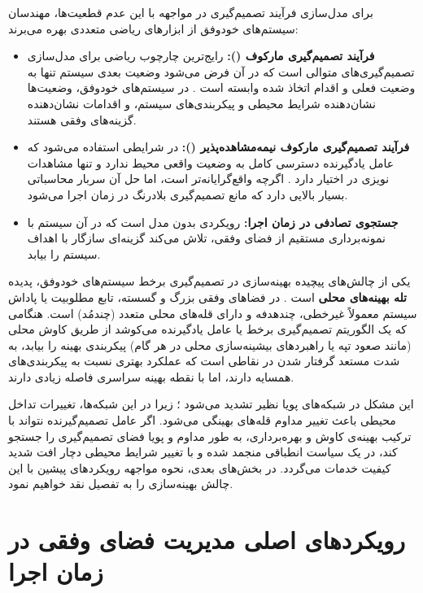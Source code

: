 \documentclass[oneside,openany,phd]{TMU-Thesis}
\begin{document}
برای مدل‌سازی فرآیند تصمیم‌گیری در مواجهه با این عدم قطعیت‌ها، مهندسان سیستم‌های خودوفق از ابزارهای ریاضی متعددی بهره می‌برند:
\begin{itemize}
    \item \textbf{فرآیند تصمیم‌گیری مارکوف ():} رایج‌ترین چارچوب ریاضی برای مدل‌سازی تصمیم‌گیری‌های متوالی است که در آن فرض می‌شود وضعیت بعدی سیستم تنها به وضعیت فعلی و اقدام اتخاذ شده وابسته است \cite{puterman1994markov}. در سیستم‌های خودوفق، وضعیت‌ها نشان‌دهنده شرایط محیطی و پیکربندی‌های سیستم، و اقدامات نشان‌دهنده گزینه‌های وفقی هستند.
    \item \textbf{فرآیند تصمیم‌گیری مارکوف نیمه‌مشاهده‌پذیر ():} در شرایطی استفاده می‌شود که عامل یادگیرنده دسترسی کامل به وضعیت واقعی محیط ندارد و تنها مشاهدات نویزی در اختیار دارد \cite{kaelbling1998planning}. اگرچه  واقع‌گرایانه‌تر است، اما حل آن سربار محاسباتی بسیار بالایی دارد که مانع تصمیم‌گیری بلادرنگ در زمان اجرا می‌شود.
    \item \textbf{جستجوی تصادفی در زمان اجرا:} رویکردی بدون مدل است که در آن سیستم با نمونه‌برداری مستقیم از فضای وفقی، تلاش می‌کند گزینه‌ای سازگار با اهداف سیستم را بیابد.
\end{itemize}

یکی از چالش‌های پیچیده بهینه‌سازی در تصمیم‌گیری برخط سیستم‌های خودوفق، پدیده \textbf{تله بهینه‌های محلی} است \cite{du2023scalability}. در فضاهای وفقی بزرگ و گسسته، تابع مطلوبیت یا پاداش سیستم معمولاً غیرخطی، چندهدفه و دارای قله‌های محلی متعدد (چندمُد) است. هنگامی که یک الگوریتم تصمیم‌گیری برخط یا عامل یادگیرنده می‌کوشد از طریق کاوش محلی (مانند صعود تپه یا راهبردهای بیشینه‌سازی محلی در هر گام) پیکربندی بهینه را بیابد، به شدت مستعد گرفتار شدن در نقاطی است که عملکرد بهتری نسبت به پیکربندی‌های همسایه دارند، اما با نقطه بهینه سراسری فاصله زیادی دارند.

این مشکل در شبکه‌های پویا نظیر  تشدید می‌شود \cite{gerostathopoulos2019deltaiot}؛ زیرا در این شبکه‌ها، تغییرات تداخل محیطی باعث تغییر مداوم قله‌های بهینگی می‌شود. اگر عامل تصمیم‌گیرنده نتواند با ترکیب بهینه‌ی کاوش و بهره‌برداری، به طور مداوم و پویا فضای تصمیم‌گیری را جستجو کند، در یک سیاست انطباقی منجمد شده و با تغییر شرایط محیطی دچار افت شدید کیفیت خدمات می‌گردد. در بخش‌های بعدی، نحوه مواجهه رویکردهای پیشین با این چالش بهینه‌سازی را به تفصیل نقد خواهیم نمود.

\section{رویکردهای اصلی مدیریت فضای وفقی در زمان اجرا}
\label{sec:ch3_approaches}
\end{document}
